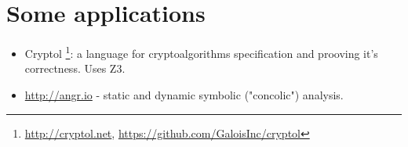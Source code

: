 \section{Some applications}

\begin{itemize}

\item Cryptol
\footnote{\url{http://cryptol.net}, \url{https://github.com/GaloisInc/cryptol}}:
a language for cryptoalgorithms specification and prooving it's correctness. Uses Z3.

\item \url{http://angr.io} - static and dynamic symbolic ("concolic") analysis.

\end{itemize}

